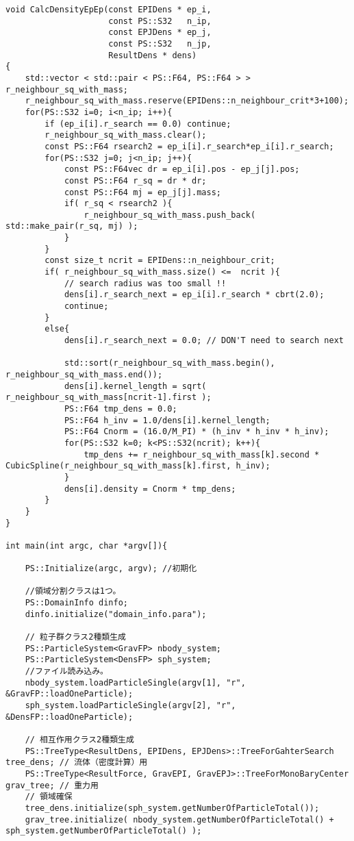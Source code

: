 \begin{lstlisting}[caption=$N$体＋SPHシミュレーションのサンプルコード]
void CalcDensityEpEp(const EPIDens * ep_i,
                     const PS::S32   n_ip,
                     const EPJDens * ep_j,
                     const PS::S32   n_jp,
                     ResultDens * dens)
{
    std::vector < std::pair < PS::F64, PS::F64 > > r_neighbour_sq_with_mass;
    r_neighbour_sq_with_mass.reserve(EPIDens::n_neighbour_crit*3+100);
    for(PS::S32 i=0; i<n_ip; i++){
        if (ep_i[i].r_search == 0.0) continue; 
        r_neighbour_sq_with_mass.clear();
        const PS::F64 rsearch2 = ep_i[i].r_search*ep_i[i].r_search;
        for(PS::S32 j=0; j<n_ip; j++){
            const PS::F64vec dr = ep_i[i].pos - ep_j[j].pos;
            const PS::F64 r_sq = dr * dr;
            const PS::F64 mj = ep_j[j].mass;
            if( r_sq < rsearch2 ){
                r_neighbour_sq_with_mass.push_back( std::make_pair(r_sq, mj) );
            }
        }
        const size_t ncrit = EPIDens::n_neighbour_crit;
        if( r_neighbour_sq_with_mass.size() <=  ncrit ){
            // search radius was too small !!
            dens[i].r_search_next = ep_i[i].r_search * cbrt(2.0);
            continue;
        }
        else{
            dens[i].r_search_next = 0.0; // DON'T need to search next

            std::sort(r_neighbour_sq_with_mass.begin(), r_neighbour_sq_with_mass.end());
            dens[i].kernel_length = sqrt( r_neighbour_sq_with_mass[ncrit-1].first );
            PS::F64 tmp_dens = 0.0;
            PS::F64 h_inv = 1.0/dens[i].kernel_length;
            PS::F64 Cnorm = (16.0/M_PI) * (h_inv * h_inv * h_inv);
            for(PS::S32 k=0; k<PS::S32(ncrit); k++){
                tmp_dens += r_neighbour_sq_with_mass[k].second * CubicSpline(r_neighbour_sq_with_mass[k].first, h_inv);
            }
            dens[i].density = Cnorm * tmp_dens;
        }
    }
}

int main(int argc, char *argv[]){

    PS::Initialize(argc, argv); //初期化

    //領域分割クラスは1つ。
    PS::DomainInfo dinfo;
    dinfo.initialize("domain_info.para");

    // 粒子群クラス2種類生成
    PS::ParticleSystem<GravFP> nbody_system; 
    PS::ParticleSystem<DensFP> sph_system; 
    //ファイル読み込み。
    nbody_system.loadParticleSingle(argv[1], "r", &GravFP::loadOneParticle); 
    sph_system.loadParticleSingle(argv[2], "r", &DensFP::loadOneParticle); 

    // 相互作用クラス2種類生成
    PS::TreeType<ResultDens, EPIDens, EPJDens>::TreeForGahterSearch tree_dens; // 流体（密度計算）用
    PS::TreeType<ResultForce, GravEPI, GravEPJ>::TreeForMonoBaryCenter grav_tree; // 重力用
    // 領域確保
    tree_dens.initialize(sph_system.getNumberOfParticleTotal()); 
    grav_tree.initialize( nbody_system.getNumberOfParticleTotal() + sph_system.getNumberOfParticleTotal() ); 


\end{lstlisting}
